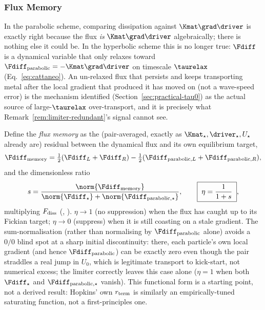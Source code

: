 \subsubsection{Flux Memory}
\label{sec:limiter-flux-memory}
In the parabolic scheme, comparing dissipation against $\Kmat\grad\driver$
is exactly right because the flux \emph{is} $\Kmat\grad\driver$
algebraically; there is nothing else it could be. In the hyperbolic
scheme this is no longer true: $\Fdiff$ is a dynamical variable that only
relaxes toward $\Fdiff_{\rm parabolic}=-\Kmat\grad\driver$ on timescale
$\taurelax$ (Eq.~\eqref{eq:cattaneo}). An un-relaxed flux that persists
and keeps transporting metal after the local gradient that produced it
has moved on (not a wave-speed error) is the mechanism identified
(Section~\ref{sec:practical-tau0}) as the actual source of large-$\taurelax$
over-transport, and it is precisely what Remark~\ref{rem:limiter-redundant}'s
signal cannot see.

Define the \emph{flux memory} as the (pair-averaged, exactly as
$\Kmat_\star,\driver_\star,U_\star$ already are) residual between the
dynamical flux and its own equilibrium target,
\begin{equation}
  \Fdiff_{\rm memory} = \tfrac12(\Fdiff_L+\Fdiff_R)
  - \tfrac12(\Fdiff_{{\rm parabolic},L}+\Fdiff_{{\rm parabolic},R}) ,
\end{equation}
and the dimensionless ratio
\begin{equation}
  s = \frac{\norm{\Fdiff_{\rm memory}}}{\norm{\Fdiff_\star}+\norm{\Fdiff_{{\rm parabolic},\star}}} ,
  \qquad
  \boxed{\;\eta = \frac{1}{1+s}\;} ,
\end{equation}
multiplying $F_{\rm diss}$ (,
). $\eta\to1$ (no suppression) when the
flux has caught up to its Fickian target; $\eta\to0$ (suppress) when it
is still coasting on a stale gradient. The sum-normalisation (rather than
normalising by $\Fdiff_{\rm parabolic}$ alone) avoids a $0/0$ blind spot
at a sharp initial discontinuity: there, each particle's own local
gradient (and hence $\Fdiff_{\rm parabolic}$) can be exactly zero
even though the pair straddles a real jump in $U_0$, which is legitimate
transport to kick-start, not numerical excess; the limiter correctly
leaves this case alone ($\eta=1$ when both $\Fdiff_\star$ and
$\Fdiff_{{\rm parabolic},\star}$ vanish). This functional form is a
starting point, not a derived result: Hopkins' own $r_{\rm term}$ is
similarly an empirically-tuned saturating function, not a first-principles
one.

